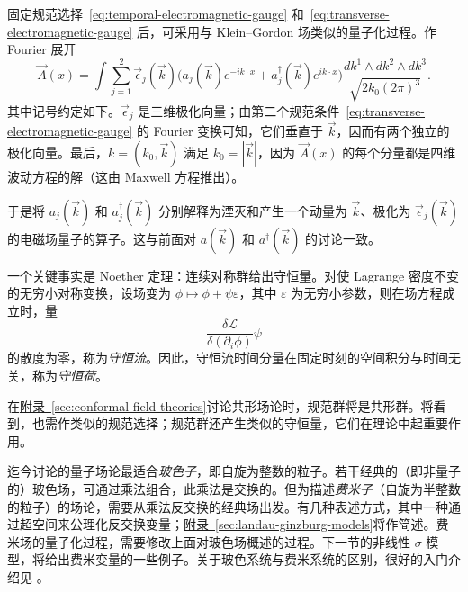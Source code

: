 固定规范选择~\eqref{eq:temporal-electromagnetic-gauge} 和~\eqref{eq:transverse-electromagnetic-gauge} 后，可采用与 Klein--Gordon 场类似的量子化过程。作 Fourier 展开
\begin{equation}\label{eq:electromagnetic-polarization-expansion}
\vec A(x)=\int\sum_{j=1}^2\vec\epsilon_j(\vec k)
\bigl(a_j(\vec k)e^{-ik\cdot x}+a_j^\dagger(\vec k)e^{ik\cdot x}\bigr)
\frac{dk^1\wedge dk^2\wedge dk^3}{\sqrt{2k_0(2\pi)^3}}.
\end{equation}
其中记号约定如下。$\vec\epsilon_j$ 是三维极化向量；由第二个规范条件~\eqref{eq:transverse-electromagnetic-gauge} 的 Fourier 变换可知，它们垂直于 $\vec k$，因而有两个独立的极化向量。最后，$k=(k_0,\vec k)$ 满足 $k_0=|\vec k|$，因为 $\vec A(x)$ 的每个分量都是四维波动方程的解（这由 Maxwell 方程推出）。

于是将 $a_j(\vec k)$ 和 $a_j^\dagger(\vec k)$ 分别解释为湮灭和产生一个动量为 $\vec k$、极化为 $\vec\epsilon_j(\vec k)$ 的电磁场量子的算子。这与前面对 $a(\vec k)$ 和 $a^\dagger(\vec k)$ 的讨论一致。

一个关键事实是 Noether 定理：连续对称群给出守恒量。对使 Lagrange 密度不变的无穷小对称变换，设场变为 $\phi\mapsto\phi+\psi\varepsilon$，其中 $\varepsilon$ 为无穷小参数，则在场方程成立时，量
\begin{equation}\label{eq:noether-conserved-current}
\frac{\delta\mathcal L}{\delta(\partial_i\phi)}\psi
\end{equation}
的散度为零，称为\emph{守恒流}。因此，守恒流时间分量在固定时刻的空间积分与时间无关，称为\emph{守恒荷}。

在\hyperref[sec:conformal-field-theories]{附录~\ref*{sec:conformal-field-theories}}讨论共形场论时，规范群将是共形群。将看到，也需作类似的规范选择；规范群还产生类似的守恒量，它们在理论中起重要作用。

迄今讨论的量子场论最适合\emph{玻色子}，即自旋为整数的粒子。若干经典的（即非量子的）玻色场，可通过乘法组合，此乘法是交换的。但为描述\emph{费米子}（自旋为半整数的粒子）的场论，需要从乘法反交换的经典场出发。有几种表述方式，其中一种通过超空间来公理化反交换变量；\hyperref[sec:landau-ginzburg-models]{附录~\ref*{sec:landau-ginzburg-models}}将作简述。费米场的量子化过程，需要修改上面对玻色场概述的过程。下一节的非线性 $\sigma$ 模型，将给出费米变量的一些例子。关于玻色系统与费米系统的区别，很好的入门介绍见 。

